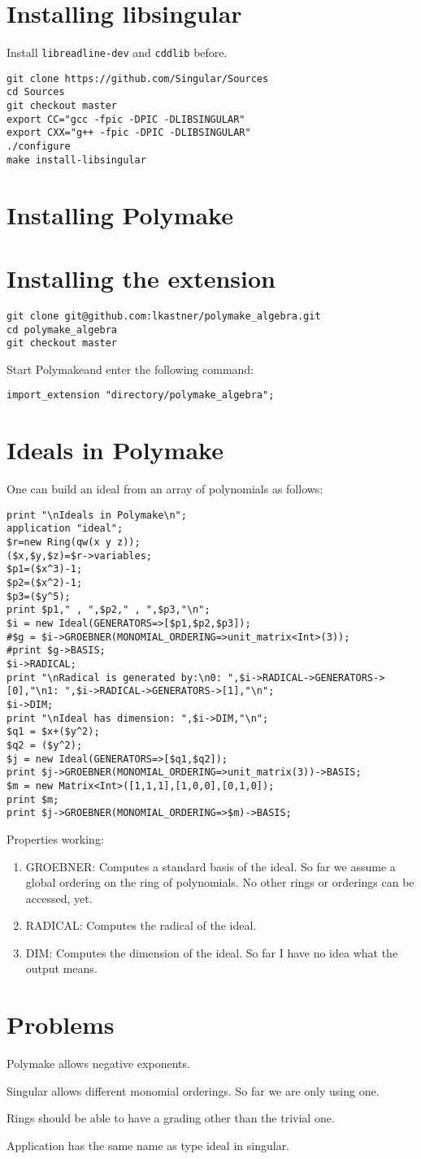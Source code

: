 \documentclass[a4paper]{article}
\newcommand{\PM}{Polymake}
\begin{document}
\section{Installing libsingular}
Install {\tt libreadline-dev} and {\tt cddlib} before.
\begin{verbatim}
git clone https://github.com/Singular/Sources
cd Sources
git checkout master
export CC="gcc -fpic -DPIC -DLIBSINGULAR"
export CXX="g++ -fpic -DPIC -DLIBSINGULAR"
./configure
make install-libsingular
\end{verbatim}
\section{Installing Polymake}

\section{Installing the extension}

\begin{verbatim}
git clone git@github.com:lkastner/polymake_algebra.git
cd polymake_algebra
git checkout master
\end{verbatim}

Start \PM and enter the following command:
\begin{verbatim}
import_extension "directory/polymake_algebra";
\end{verbatim}
\section{Ideals in Polymake}
One can build an ideal from an array of polynomials as follows:
\begin{verbatim}
print "\nIdeals in Polymake\n";
application "ideal";
$r=new Ring(qw(x y z));
($x,$y,$z)=$r->variables;
$p1=($x^3)-1;
$p2=($x^2)-1;
$p3=($y^5);
print $p1," , ",$p2," , ",$p3,"\n";
$i = new Ideal(GENERATORS=>[$p1,$p2,$p3]);
#$g = $i->GROEBNER(MONOMIAL_ORDERING=>unit_matrix<Int>(3));
#print $g->BASIS;
$i->RADICAL;
print "\nRadical is generated by:\n0: ",$i->RADICAL->GENERATORS->[0],"\n1: ",$i->RADICAL->GENERATORS->[1],"\n";
$i->DIM;
print "\nIdeal has dimension: ",$i->DIM,"\n";
$q1 = $x+($y^2);
$q2 = ($y^2);
$j = new Ideal(GENERATORS=>[$q1,$q2]);
print $j->GROEBNER(MONOMIAL_ORDERING=>unit_matrix(3))->BASIS;
$m = new Matrix<Int>([1,1,1],[1,0,0],[0,1,0]);
print $m;
print $j->GROEBNER(MONOMIAL_ORDERING=>$m)->BASIS;
\end{verbatim}
Properties working:
\begin{enumerate}
\item GROEBNER: Computes a standard basis of the ideal. So far we assume a global ordering on the ring of polynomials. No other rings or orderings can be accessed, yet.
\item RADICAL: Computes the radical of the ideal.
\item DIM: Computes the dimension of the ideal. So far I have no idea what the output means.
\end{enumerate}
\section{Problems}
Polymake allows negative exponents.

Singular allows different monomial orderings. So far we are only using one.

Rings should be able to have a grading other than the trivial one.

Application has the same name as type ideal in singular.
\end{document}
